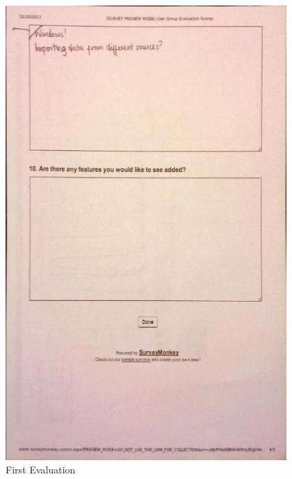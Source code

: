 \begin{figure}[h!]
    \centering
    \includegraphics[width=0.95\textwidth]{images/user_eval/user_eval_4.jpg}
    \caption{First Evaluation}
\end{figure}

